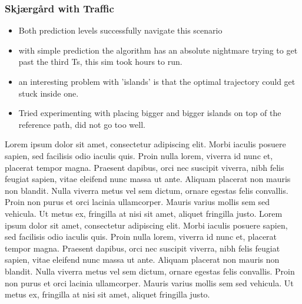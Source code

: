 \subsubsection{Skjærgård with Traffic}
\begin{itemize}

    \item Both prediction levels successfully navigate this scenario
    \item with simple prediction the algorithm has an absolute nightmare trying to get past the third \gls{Ts}, this sim took hours to run.
    \item an interesting problem with 'islands' is that the optimal trajectory could get stuck inside one.
    \item Tried experimenting with placing bigger and bigger islands on top of the reference path, did not go too well.
\end{itemize}
Lorem ipsum dolor sit amet, consectetur adipiscing elit. Morbi iaculis posuere sapien, sed facilisis odio iaculis quis. 
Proin nulla lorem, viverra id nunc et, placerat tempor magna. Praesent dapibus, orci nec suscipit viverra, nibh felis feugiat sapien, 
vitae eleifend nunc massa ut ante. Aliquam placerat non mauris non blandit. Nulla viverra metus vel sem dictum, ornare egestas felis convallis. 
Proin non purus et orci lacinia ullamcorper. Mauris varius mollis sem sed vehicula. Ut metus ex, fringilla at nisi sit amet, aliquet fringilla justo.
Lorem ipsum dolor sit amet, consectetur adipiscing elit. Morbi iaculis posuere sapien, sed facilisis odio iaculis quis. 
Proin nulla lorem, viverra id nunc et, placerat tempor magna. Praesent dapibus, orci nec suscipit viverra, nibh felis feugiat sapien, 
vitae eleifend nunc massa ut ante. Aliquam placerat non mauris non blandit. Nulla viverra metus vel sem dictum, ornare egestas felis convallis. 
Proin non purus et orci lacinia ullamcorper. Mauris varius mollis sem sed vehicula. Ut metus ex, fringilla at nisi sit amet, aliquet fringilla justo.

